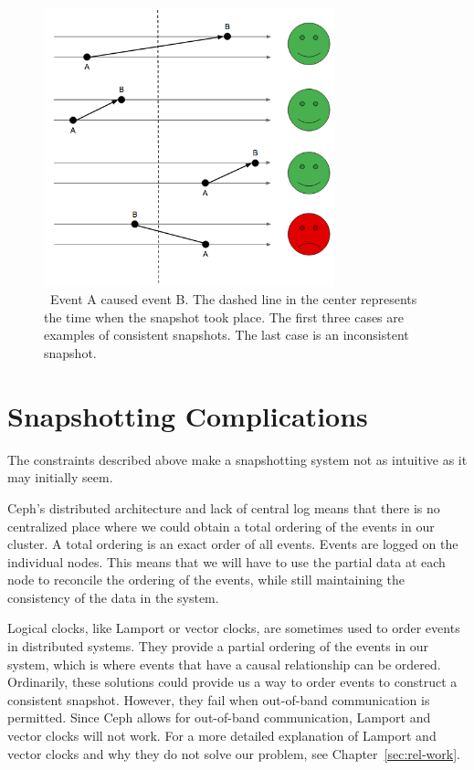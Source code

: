 \begin{figure}[!htbp]
  \centering
  \caption{~Event A caused event B. The dashed line in the center represents the time when the snapshot took place. The first three cases are examples of consistent snapshots. The last case is an inconsistent snapshot.} 
  \label{fig:consistency}
  \includegraphics[width=0.75\textwidth]{consistency.png}
\end{figure}

\section{Snapshotting Complications}

The constraints described above make a snapshotting system not as intuitive as
it may initially seem.

Ceph's distributed architecture and lack of central log means that there is no
centralized place where we could obtain a total ordering of the events in our
cluster. A total ordering is an exact order of all events. Events
are logged on the individual nodes. This means that we will have to
use the partial data at each node to reconcile the ordering of the events, 
while still maintaining the consistency of the data in the system.

Logical clocks, like Lamport or vector clocks, are sometimes used to order 
events in distributed systems. They provide a partial ordering of the events in our system, which is
where events that have a causal relationship can be ordered. Ordinarily, these solutions could provide us a way to order events to construct a consistent 
snapshot. However, they fail when
out-of-band communication is permitted. Since Ceph allows for out-of-band 
communication, Lamport and vector clocks will not work. For a more detailed explanation
of Lamport and vector clocks and why they do not solve our problem, see 
Chapter~\ref{sec:rel-work}.

